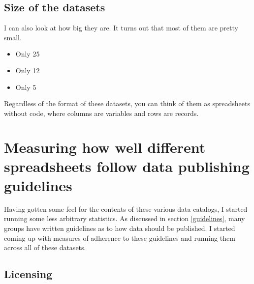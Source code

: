 \documentclass{acm_proc_article-sp}
\begin{document}
\subsection{Size of the datasets}
I can also look at how big they are.
It turns out that most of them are pretty small.

\begin{itemize}
\item Only 25%
\item Only 12%
\item Only 5%
\end{itemize}


Regardless of the format of these datasets, you can think of them as
spreadsheets without code, where columns are variables and rows are records.

\section{Measuring how well different spreadsheets follow data publishing guidelines}
Having gotten some feel for the contents of these various data catalogs,
I started running some less arbitrary statistics.
As discussed in section \ref{guidelines}, many groups have written guidelines
as to how data should be published.%
\cite{open-data-census,fivestars,sunlight,sebastopol,odi}
I started coming up with measures of adherence to these guidelines and running
them across all of these datasets.

\subsection{Licensing}
\end{document}
